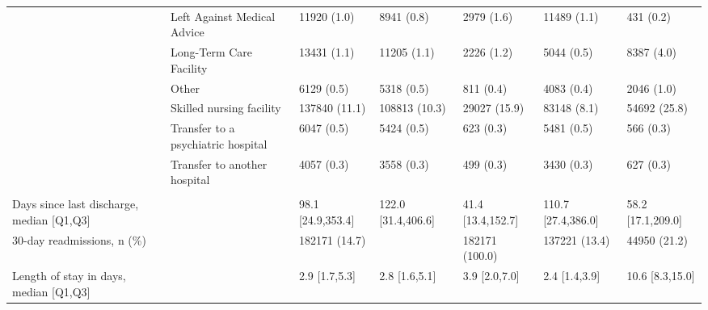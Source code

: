 \begin{adjustbox}{width={\textwidth},totalheight={\textheight},keepaspectratio,frame}
{\begin{tabular}{L{20em}C{10em}C{10em}C{10em}C{10em}C{10em}}
 & \hspace{3mm} Left Against Medical Advice & 11920 (1.0) & 8941 (0.8) & 2979 (1.6) & 11489 (1.1) & 431 (0.2)\\
 & \hspace{3mm} Long-Term Care Facility & 13431 (1.1) & 11205 (1.1) & 2226 (1.2) & 5044 (0.5) & 8387 (4.0)\\
 & \hspace{3mm} Other & 6129 (0.5) & 5318 (0.5) & 811 (0.4) & 4083 (0.4) & 2046 (1.0)\\
 & \hspace{3mm} Skilled nursing facility & 137840 (11.1) & 108813 (10.3) & 29027 (15.9) & 83148 (8.1) & 54692 (25.8)\\
 & \hspace{3mm} Transfer to a psychiatric hospital & 6047 (0.5) & 5424 (0.5) & 623 (0.3) & 5481 (0.5) & 566 (0.3)\\
 & \hspace{3mm} Transfer to another hospital & 4057 (0.3) & 3558 (0.3) & 499 (0.3) & 3430 (0.3) & 627 (0.3)\\
 &  &  &  &  &  & \\
Days since last discharge, median [Q1,Q3] &  & 98.1 [24.9,353.4] & 122.0 [31.4,406.6] & 41.4 [13.4,152.7] & 110.7 [27.4,386.0] & 58.2 [17.1,209.0]\\
30-day readmissions, n (\%) &  & 182171 (14.7) &  & 182171 (100.0) & 137221 (13.4) & 44950 (21.2)\\
Length of stay in days, median [Q1,Q3] &  & 2.9 [1.7,5.3] & 2.8 [1.6,5.1] & 3.9 [2.0,7.0] & 2.4 [1.4,3.9] & 10.6 [8.3,15.0]\\
\end{tabular}
\label{table:table1}
}
\end{adjustbox}
